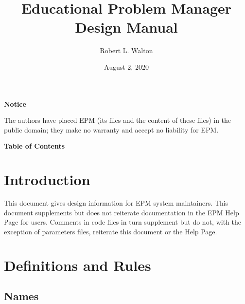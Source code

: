 \documentclass[12pt]{article}
\makeatletter
\renewcommand\tableofcontents{%
    \begin{list}{}%
	     {\setlength{\itemsep}{0in}%
	      \setlength{\topsep}{0in}%
	      \setlength{\parsep}{1ex}%
	      \setlength{\labelwidth}{0in}%
	      \setlength{\baselineskip}{1.5ex}%
	      \setlength{\leftmargin}{0.8in}%
	      \setlength{\rightmargin}{0.8in}}%
    \item\@starttoc{toc}%
    \end{list}}
\makeatother
\begin{document}
        
\title{Educational Problem Manager\\
Design Manual}

\author{Robert L. Walton}

\date{August 2, 2020}
 
\maketitle

\begin{center}
{\large \bf Notice}
\\[2ex]
\begin{minipage}{5.5in}
The authors have placed EPM (its files and the content of these files) in
the public domain; they make no warranty and accept
no liability for EPM.
\end{minipage}
\end{center}
\begin{center}
\large \bf Table of Contents
\end{center}

\bigskip

\tableofcontents 

\newpage

\section{Introduction}

This document gives design information for EPM system maintainers.
This document supplements but does not reiterate
documentation in the EPM Help Page for
users.  Comments in code files in turn supplement but do not, with
the exception of parameters files,
reiterate this document or the Help Page.

\section{Definitions and Rules}

\subsection{Names}
\end{document}
